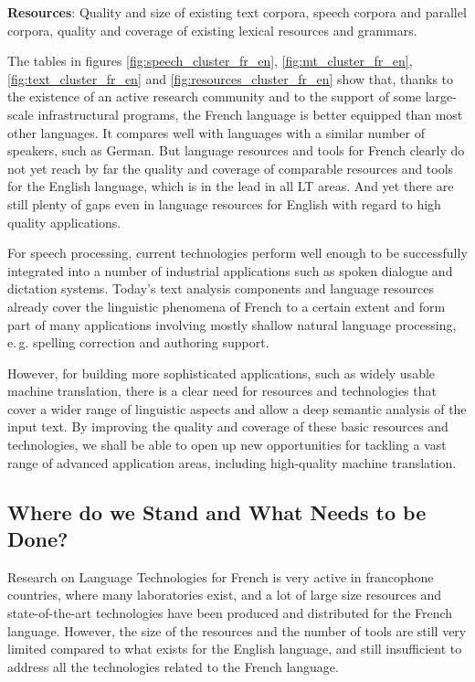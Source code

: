 \begin{multicols}{2}
{\bf Resources}: Quality and size of existing text corpora, speech
corpora and parallel corpora, quality and coverage of existing lexical
resources and grammars.



The tables in figures \ref{fig:speech_cluster_fr_en},
\ref{fig:mt_cluster_fr_en}, \ref{fig:text_cluster_fr_en} and
\ref{fig:resources_cluster_fr_en} show that, thanks to the existence
of an active research community and to the support of some large-scale
infrastructural programs, the French language is better equipped than
most other languages. It compares well with languages with a similar
number of speakers, such as German. But language resources and tools
for French clearly do not yet reach by far the quality and coverage of
comparable resources and tools for the English language, which is in
the lead in all LT areas. And yet there are still plenty of
gaps even in language resources for English with regard to high
quality applications.

For speech processing, current technologies perform well enough to be
successfully integrated into a number of industrial applications such
as spoken dialogue and dictation systems. Today’s text analysis
components and language resources already cover the linguistic
phenomena of French to a certain extent and form part of many
applications involving mostly shallow natural language processing,
e.\,g. spelling correction and authoring support.

However, for building more sophisticated applications, such as widely
usable machine translation, there is a clear need for resources and
technologies that cover a wider range of linguistic aspects and allow
a deep semantic analysis of the input text. By improving the quality
and coverage of these basic resources and technologies, we shall be
able to open up new opportunities for tackling a vast range of
advanced application areas, including high-quality machine
translation.

\subsection{Where do we Stand and What Needs to be Done?}

Research on Language Technologies for French is very active in
francophone countries, where many laboratories exist, and a lot of
large size resources and state-of-the-art technologies have been
produced and distributed for the French language. However, the size of
the resources and the number of tools are still very limited compared
to what exists for the English language, and still insufficient to
address all the technologies related to the French language.


\end{multicols}
